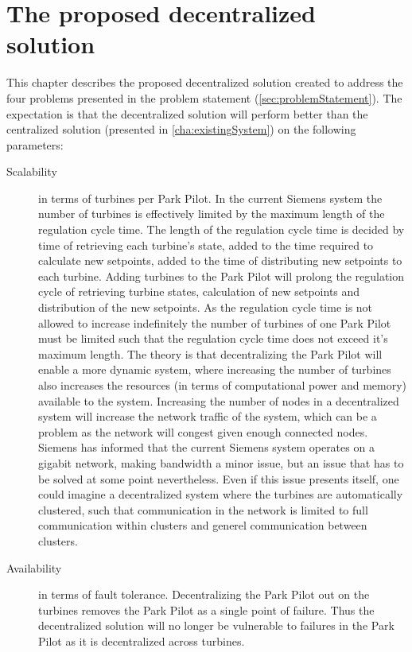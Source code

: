 \chapter{The proposed decentralized solution}\label{cha:decentralizedSystem}

This chapter describes the proposed decentralized solution created to address the four problems presented in the problem statement (\cref{sec:problemStatement}). The expectation is that the decentralized solution will perform better than the centralized solution (presented in \cref{cha:existingSystem}) on the following parameters:

\begin{description}
	\item[Scalability] in terms of turbines per Park Pilot.
	In the current Siemens system the number of turbines is effectively limited by the maximum length of the regulation cycle time.
	The length of the regulation cycle time is decided by time of retrieving each turbine's state, added to the time required to calculate new setpoints, added to the time of distributing new setpoints to each turbine. Adding turbines to the Park Pilot will prolong the regulation cycle of retrieving turbine states, calculation of new setpoints and distribution of the new setpoints. As the regulation cycle time is not allowed to increase indefinitely the number of turbines of one Park Pilot must be limited such that the regulation cycle time does not exceed it's maximum length.
	The theory is that decentralizing the Park Pilot will enable a more dynamic system, where increasing the number of turbines also increases the resources (in terms of computational power and memory) available to the system. Increasing the number of nodes in a decentralized system will increase the network traffic of the system, which can be a problem as the network will congest given enough connected nodes. Siemens has informed that the current Siemens system operates on a gigabit network, making bandwidth a minor issue, but an issue that has to be solved at some point nevertheless. Even if this issue presents itself, one could imagine a decentralized system where the turbines are automatically clustered, such that communication in the network is limited to full communication within clusters and generel communication between clusters.
	\item[Availability] in terms of fault tolerance. Decentralizing the Park Pilot out on the turbines removes the Park Pilot as a single point of failure. Thus the decentralized solution will no longer be vulnerable to failures in the Park Pilot as it is decentralized across turbines.

\end{description}
